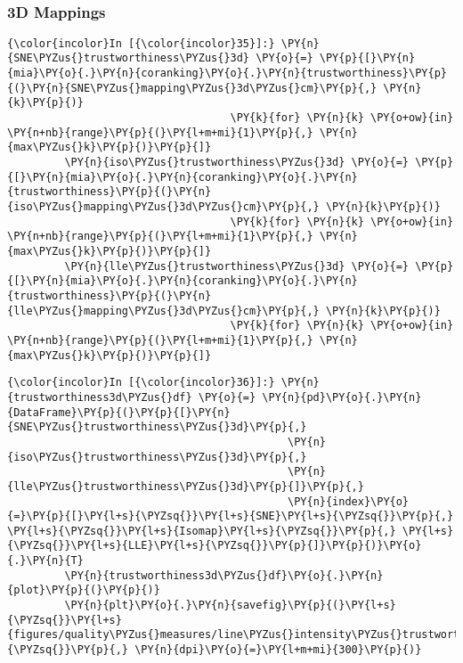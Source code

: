     \begin{center}
    \end{center}
    { \hspace*{\fill} \\}

    \subsubsection{3D Mappings}\label{d-mappings}

    \begin{Verbatim}[commandchars=\\\{\}]
{\color{incolor}In [{\color{incolor}35}]:} \PY{n}{SNE\PYZus{}trustworthiness\PYZus{}3d} \PY{o}{=} \PY{p}{[}\PY{n}{mia}\PY{o}{.}\PY{n}{coranking}\PY{o}{.}\PY{n}{trustworthiness}\PY{p}{(}\PY{n}{SNE\PYZus{}mapping\PYZus{}3d\PYZus{}cm}\PY{p}{,} \PY{n}{k}\PY{p}{)}
                                   \PY{k}{for} \PY{n}{k} \PY{o+ow}{in} \PY{n+nb}{range}\PY{p}{(}\PY{l+m+mi}{1}\PY{p}{,} \PY{n}{max\PYZus{}k}\PY{p}{)}\PY{p}{]}
         \PY{n}{iso\PYZus{}trustworthiness\PYZus{}3d} \PY{o}{=} \PY{p}{[}\PY{n}{mia}\PY{o}{.}\PY{n}{coranking}\PY{o}{.}\PY{n}{trustworthiness}\PY{p}{(}\PY{n}{iso\PYZus{}mapping\PYZus{}3d\PYZus{}cm}\PY{p}{,} \PY{n}{k}\PY{p}{)}
                                   \PY{k}{for} \PY{n}{k} \PY{o+ow}{in} \PY{n+nb}{range}\PY{p}{(}\PY{l+m+mi}{1}\PY{p}{,} \PY{n}{max\PYZus{}k}\PY{p}{)}\PY{p}{]}
         \PY{n}{lle\PYZus{}trustworthiness\PYZus{}3d} \PY{o}{=} \PY{p}{[}\PY{n}{mia}\PY{o}{.}\PY{n}{coranking}\PY{o}{.}\PY{n}{trustworthiness}\PY{p}{(}\PY{n}{lle\PYZus{}mapping\PYZus{}3d\PYZus{}cm}\PY{p}{,} \PY{n}{k}\PY{p}{)}
                                   \PY{k}{for} \PY{n}{k} \PY{o+ow}{in} \PY{n+nb}{range}\PY{p}{(}\PY{l+m+mi}{1}\PY{p}{,} \PY{n}{max\PYZus{}k}\PY{p}{)}\PY{p}{]}
\end{Verbatim}

    \begin{Verbatim}[commandchars=\\\{\}]
{\color{incolor}In [{\color{incolor}36}]:} \PY{n}{trustworthiness3d\PYZus{}df} \PY{o}{=} \PY{n}{pd}\PY{o}{.}\PY{n}{DataFrame}\PY{p}{(}\PY{p}{[}\PY{n}{SNE\PYZus{}trustworthiness\PYZus{}3d}\PY{p}{,}
                                            \PY{n}{iso\PYZus{}trustworthiness\PYZus{}3d}\PY{p}{,}
                                            \PY{n}{lle\PYZus{}trustworthiness\PYZus{}3d}\PY{p}{]}\PY{p}{,}
                                            \PY{n}{index}\PY{o}{=}\PY{p}{[}\PY{l+s}{\PYZsq{}}\PY{l+s}{SNE}\PY{l+s}{\PYZsq{}}\PY{p}{,} \PY{l+s}{\PYZsq{}}\PY{l+s}{Isomap}\PY{l+s}{\PYZsq{}}\PY{p}{,} \PY{l+s}{\PYZsq{}}\PY{l+s}{LLE}\PY{l+s}{\PYZsq{}}\PY{p}{]}\PY{p}{)}\PY{o}{.}\PY{n}{T}
         \PY{n}{trustworthiness3d\PYZus{}df}\PY{o}{.}\PY{n}{plot}\PY{p}{(}\PY{p}{)}
         \PY{n}{plt}\PY{o}{.}\PY{n}{savefig}\PY{p}{(}\PY{l+s}{\PYZsq{}}\PY{l+s}{figures/quality\PYZus{}measures/line\PYZus{}intensity\PYZus{}trustworthiness\PYZus{}3d.png}\PY{l+s}{\PYZsq{}}\PY{p}{,} \PY{n}{dpi}\PY{o}{=}\PY{l+m+mi}{300}\PY{p}{)}
\end{Verbatim}

